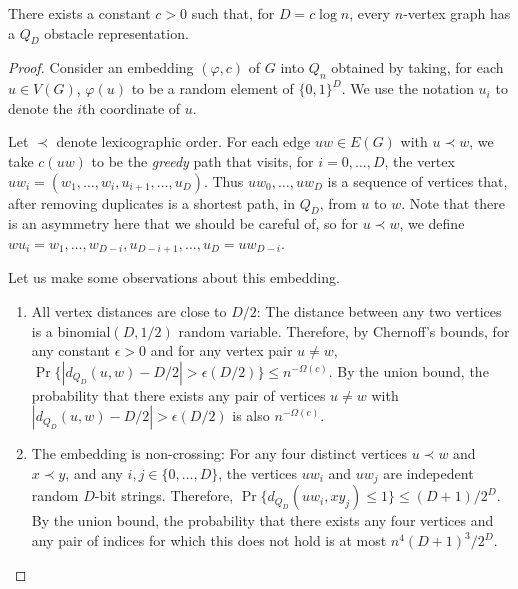 \documentclass{patmorin}
\newcommand{\eps}{\epsilon}
\begin{document}
\begin{thm}
  There exists a constant $c>0$ such that, for $D=c\log n$, every $n$-vertex graph has a $Q_D$ obstacle representation.
\end{thm}

\begin{proof}
   Consider an embedding $(\varphi,c)$ of $G$ into $Q_n$ obtained by
   taking, for each $u\in V(G)$, $\varphi(u)$ to be a random element of
   $\{0,1\}^D$.  We use the notation $u_i$ to denote the $i$th coordinate
   of $u$.

   Let $\prec$ denote lexicographic order.  For each edge
   $uw\in E(G)$ with $u\prec w$, we take $c(uw)$ to be the
   \emph{greedy} path that visits, for $i=0,\ldots,D$, the vertex
   $uw_i=(w_1,\ldots,w_i,u_{i+1},\ldots,u_D)$.  Thus $uw_0,\ldots,uw_D$
   is a sequence of vertices that, after removing duplicates is a
   shortest path, in $Q_D$, from $u$ to $w$.  Note that there is an
   asymmetry here that we should be careful of, so for $u\prec w$,
   we define $wu_i=w_1,\ldots,w_{D-i},u_{D-i+1},\ldots,u_{D}=uw_{D-i}$.
 
   Let us make some observations about this embedding.
   \begin{enumerate}
      \item All vertex distances are close to $D/2$:
       The distance between any two vertices is a
       binomial$(D,1/2)$ random variable.  Therefore, by Chernoff's
       bounds, for any constant $\eps>0$ and for any vertex pair $u\neq
       w$, $\Pr\{|d_{Q_D}(u,w)-D/2| > \eps(D/2)\} \le n^{-\Omega(c)}$.  By the
       union bound, the probability that there exists any pair of vertices
       $u\neq w$ with $|d_{Q_D}(u,w)-D/2| > \eps(D/2)$ is also $n^{-\Omega(c)}$.

      \item The embedding is non-crossing: For any four distinct vertices
      $u\prec w$ and $x\prec y$, and any $i,j\in\{0,\ldots,D\}$, the
      vertices $uw_i$ and $uw_j$ are indepedent random $D$-bit strings.
      Therefore, $\Pr\{d_{Q_D}(uw_i,xy_j)\le 1\} \le (D+1)/2^{D}$.
      By the union bound, the probability that there exists any four
      vertices and any pair of indices for which this does not hold is
      at most $n^4(D+1)^3/2^{D}$.


\end{enumerate}
\end{proof}
\end{document}
